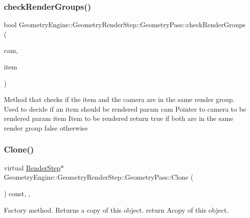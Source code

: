 \subsubsection{\texorpdfstring{checkRenderGroups()}{checkRenderGroups()}}
{\footnotesize\ttfamily bool Geometry\+Engine\+::\+Geometry\+Render\+Step\+::\+Geometry\+Pass\+::check\+Render\+Groups (\begin{DoxyParamCaption}\item[{\mbox{\hyperlink{class_geometry_engine_1_1_geometry_world_item_1_1_geometry_camera_1_1_camera}{Geometry\+World\+Item\+::\+Geometry\+Camera\+::\+Camera}} $\ast$}]{cam,  }\item[{\mbox{\hyperlink{class_geometry_engine_1_1_geometry_world_item_1_1_geometry_item_1_1_geometry_item}{Geometry\+World\+Item\+::\+Geometry\+Item\+::\+Geometry\+Item}} $\ast$}]{item }\end{DoxyParamCaption})\hspace{0.3cm}{\ttfamily [protected]}}

Method that checks if the item and the camera are in the same render group. Used to decide if an item should be rendered param cam Pointer to camera to be rendered param item Item to be rendered return true if both are in the same render group false otherwise \mbox{\label{class_geometry_engine_1_1_geometry_render_step_1_1_geometry_pass_a12e85a0169cb7b92cb8bd7b7fe100b33}} 
\subsubsection{\texorpdfstring{Clone()}{Clone()}}
{\footnotesize\ttfamily virtual \mbox{\hyperlink{class_geometry_engine_1_1_geometry_render_step_1_1_render_step}{Render\+Step}}$\ast$ Geometry\+Engine\+::\+Geometry\+Render\+Step\+::\+Geometry\+Pass\+::\+Clone (\begin{DoxyParamCaption}{ }\end{DoxyParamCaption}) const\hspace{0.3cm}{\ttfamily [inline]}, {\ttfamily [override]}, {\ttfamily [virtual]}}

Factory method. Returns a copy of this object. return Acopy of this object. 


